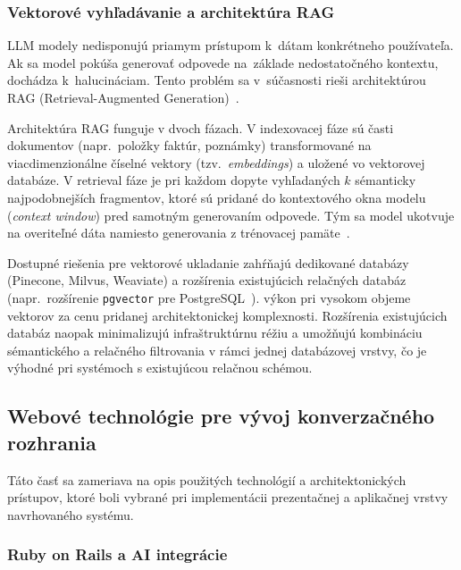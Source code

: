 \subsubsection{Vektorové vyhľadávanie a architektúra RAG}

LLM modely nedisponujú priamym prístupom k~dátam konkrétneho používateľa. Ak sa
model pokúša generovať odpovede na~základe nedostatočného kontextu, dochádza k~halucináciam.
Tento problém sa v~súčasnosti rieši architektúrou RAG (Retrieval-Augmented Generation)~\cite{lewis2020rag,
zhao2023}.

Architektúra RAG funguje v dvoch fázach. V indexovacej fáze sú časti dokumentov (napr.\ položky
faktúr, poznámky) transformované na viacdimenzionálne číselné vektory (tzv.\ \textit{embeddings})
a uložené vo vektorovej databáze. V retrieval fáze je pri každom dopyte
vyhľadaných $k$ sémanticky najpodobnejších fragmentov, ktoré sú pridané do kontextového
okna modelu (\textit{context window}) pred samotným generovaním odpovede. Tým sa model
ukotvuje na overiteľné dáta namiesto generovania z trénovacej pamäte~\cite{zhao2023}.

Dostupné riešenia pre vektorové ukladanie zahŕňajú dedikované databázy (Pinecone,
Milvus, Weaviate) a rozšírenia existujúcich relačných databáz (napr.\ rozšírenie \texttt{pgvector}
pre PostgreSQL~\cite{pgvector2023}). %
výkon pri vysokom objeme vektorov za cenu pridanej architektonickej komplexnosti.
Rozšírenia existujúcich databáz naopak minimalizujú infraštruktúrnu réžiu a
umožňujú kombináciu sémantického a relačného filtrovania v rámci jednej
databázovej vrstvy, čo je výhodné pri systémoch s existujúcou relačnou schémou.

\subsection{Webové technológie pre vývoj konverzačného rozhrania}

Táto časť sa zameriava na opis použitých technológií a architektonických
prístupov, ktoré boli vybrané pri implementácii prezentačnej a aplikačnej vrstvy navrhovaného
systému.

\subsubsection{Ruby on Rails a AI integrácie}

